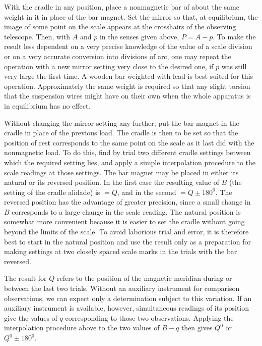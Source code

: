 With the cradle in any position, place a nonmagnetic bar of about the same weight in it in place of the bar magnet. Set the mirror so that, at equilibrium, the image of some point on the scale appears at the crosshairs of the observing telescope. Then, with $A$ and $p$ in the senses given above, $P=A-p$. To make the result less dependent on a very precise knowledge of the value of a scale division or on a very accurate conversion into divisions of arc, one may repeat the operation with a new mirror setting very close to the desired one, if $p$ was still very large the first time. A wooden bar weighted with lead is best suited for this operation. Approximately the same weight is required so that any slight torsion that the suspension wires might have on their own when the whole apparatus is in equilibrium has no effect.

Without changing the mirror setting any further, put the bar magnet in the cradle in place of the previous load. The cradle is then to be set
so that the position of rest corresponds to the same point on the scale as it last did with the nonmagnetic load. To do this, find by trial two different cradle settings between which the required setting lies, and apply a simple interpolation procedure to the scale readings at those settings. The bar magnet may be placed in either its natural or its reversed position. In the first case the resulting value of $B$ (the setting of the cradle alidade) is $=Q$, and in the second $=Q\pm180^0$. The reversed position has the advantage of greater precision, since a small change in $B$ corresponds to a large change in the scale reading. The natural position is somewhat more convenient because it is easier to set the cradle without going beyond the limits of the scale. To avoid laborious trial and error, it is therefore best to start in the natural position and use the result only as a preparation for making settings at two closely spaced scale marks in the trials with the bar reversed.

The result for $Q$ refers to the position of the magnetic meridian during or between the last two trials. Without an auxiliary instrument for comparison observations, we can expect only a determination subject to this variation. If an auxiliary instrument is available, however, simultaneous readings of its position give the values of $q$ corresponding to those two observations. Applying the interpolation procedure above to the two values of $B-q$ then gives $Q^0$ or $Q^0\pm180^0$.

